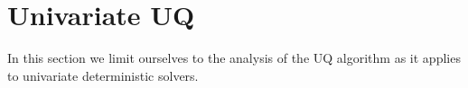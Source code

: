 \section{Univariate UQ}
In this section we limit ourselves to the analysis of the UQ algorithm as it applies to univariate deterministic solvers.
